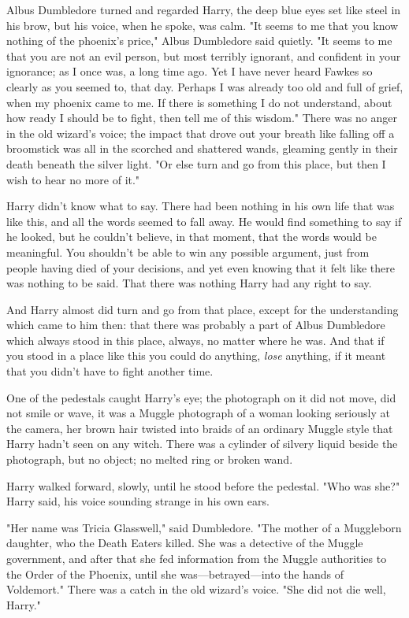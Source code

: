 Albus Dumbledore turned and regarded Harry, the deep blue eyes set like steel
in his brow, but his voice, when he spoke, was calm. "It seems to me that you
know nothing of the phoenix's price," Albus Dumbledore said quietly. "It seems
to me that you are not an evil person, but most terribly ignorant, and
confident in your ignorance; as I once was, a long time ago. Yet I have never
heard Fawkes so clearly as you seemed to, that day. Perhaps I was already too
old and full of grief, when my phoenix came to me. If there is something I do
not understand, about how ready I should be to fight, then tell me of this
wisdom." There was no anger in the old wizard's voice; the impact that drove
out your breath like falling off a broomstick was all in the scorched and
shattered wands, gleaming gently in their death beneath the silver light. "Or
else turn and go from this place, but then I wish to hear no more of it."

Harry didn't know what to say. There had been nothing in his own life that was
like this, and all the words seemed to fall away. He would find something to
say if he looked, but he couldn't believe, in that moment, that the words would
be meaningful. You shouldn't be able to win any possible argument, just from
people having died of your decisions, and yet even knowing that it felt like
there was nothing to be said. That there was nothing Harry had any right to say.

And Harry almost did turn and go from that place, except for the understanding
which came to him then: that there was probably a part of Albus Dumbledore
which always stood in this place, always, no matter where he was. And that if
you stood in a place like this you could do anything, \emph{lose} anything, if
it meant that you didn't have to fight another time.

One of the pedestals caught Harry's eye; the photograph on it did not move, did
not smile or wave, it was a Muggle photograph of a woman looking seriously at
the camera, her brown hair twisted into braids of an ordinary Muggle style that
Harry hadn't seen on any witch. There was a cylinder of silvery liquid beside
the photograph, but no object; no melted ring or broken wand.

Harry walked forward, slowly, until he stood before the pedestal. "Who was
she?" Harry said, his voice sounding strange in his own ears.

"Her name was Tricia Glasswell," said Dumbledore. "The mother of a Muggleborn
daughter, who the Death Eaters killed. She was a detective of the Muggle
government, and after that she fed information from the Muggle authorities to
the Order of the Phoenix, until she was---betrayed---into the hands of
Voldemort." There was a catch in the old wizard's voice. "She did not die well,
Harry."

